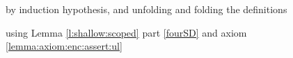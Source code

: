 \begin{description}
% 
 
  \item[{}]  by induction hypothesis, and unfolding and folding the definitions
  
 \item[{}]  using Lemma \ref{l:shallow:scoped} part \ref{fourSD}  and axiom \ref{lemma:axiom:enc:assert:ul}


\end{description}
